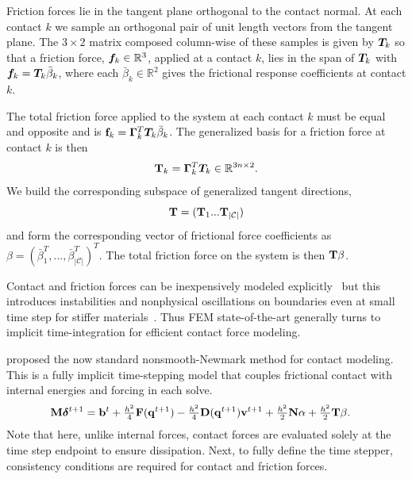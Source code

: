 Friction forces lie in the tangent plane orthogonal to the contact normal. At each contact $k$ we sample an orthogonal pair of unit length vectors from the tangent plane. The $3\times2$ matrix composed column-wise of these samples is given by $\bm{T}_k$ so that a friction force, $\bm{f}_k \in \mathbb{R}^3$, applied at a contact $k$, lies in the span of $\bm{T}_k$ with $\bm{f}_k = \bm{T}_k \bar{\beta}_k$, where each $\bar{\beta}_k \in \mathbb{R}^2$ gives the frictional response coefficients at contact $k$.

The total friction force applied to the system at each contact $k$ must be equal and opposite and is $\mathbf {f}_k = \mathbf {\Gamma}_k^T \bm{T}_k \bar{\beta}_k$. 
The generalized basis for a friction force at contact $k$ is then 
\begin{equation}
\mathbf {T}_k = \mathbf {\Gamma}_k^T \bm{T}_k \in \mathbb{R}^{3n \times 2}.
\end{equation}
We build the corresponding subspace of generalized tangent directions,
\begin{equation}
\mathbf {T} = ( \mathbf {T}_1 ... \mathbf {T}_{|\mathcal C|})
\end{equation}
and form the corresponding vector of frictional force coefficients as $\beta = ( \bar{\beta}^T_1,  ... , \bar{\beta}^T_{|\mathcal C|})^T$.
The total friction force on the system is then $\mathbf {T} \beta$.

Contact and friction forces can be inexpensively modeled explicitly~\citep{Belytschko:2013tz} but this introduces instabilities and nonphysical oscillations on boundaries even at small time step for stiffer materials~\cite{Deuflhard:2008fu}. Thus FEM state-of-the-art generally turns to implicit time-integration for efficient contact force modeling. 

\citet{Kane:1999kr} proposed the now standard nonsmooth-Newmark method for contact modeling. 
This is a fully implicit time-stepping model that couples frictional contact with internal energies and forcing in each solve.
\begin{align}
\begin{split}
\mathbf {M} \bm{\delta}^{t+1} &= \mathbf {b}^t +  \tfrac{h^2}{4} \mathbf {F}(\mathbf {q}^{t+1}) -\tfrac{h^2}{4} \mathbf {D}(\mathbf {q}^{t+1}) \mathbf {v}^{t+1} + \tfrac{h^2}{2} \mathbf {N} \alpha +  \tfrac{h^2}{2}  \mathbf {T} \beta.
\label{eq:newmark_contact_implicit}
\end{split}
\end{align}
Note that here, unlike internal forces, contact forces are evaluated solely at the time step endpoint to ensure dissipation.
Next, to fully define the time stepper, consistency conditions are required for contact and friction forces. 


